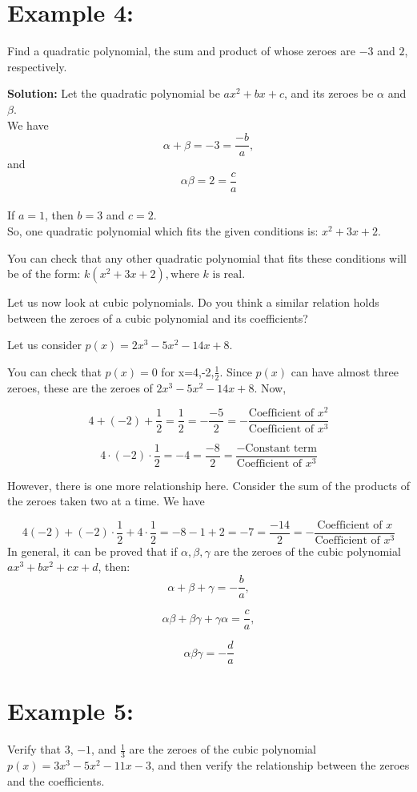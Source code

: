 \documentclass[12pt,twoside]{article}
\newcommand{\solution}{\noindent \textbf{\textcolor{customblue}{Solution:} }}
\begin{document}
\section*{\textcolor{customblue}{Example 4:}}

Find a quadratic polynomial, the sum and product of whose zeroes are $-3$ and $2$, respectively.

\solution Let the quadratic polynomial be $ax^2 + bx + c$, and its zeroes be $\alpha$ and $\beta$. \\
We have
\[\alpha + \beta = -3 = \frac{-b}{a},\]
and \[\alpha\beta=2=\frac{c}{a}\]
\\If $a = 1$, then $b=3$ and $c=2.$
\\So, one quadratic polynomial which fits the given conditions is:
$x^2 + 3x + 2.$

You can check that any other quadratic polynomial that fits these conditions will be of the form:
$k(x^2 + 3x + 2), \text {where \(k\) is real.}$

Let us now look at cubic polynomials. Do you think a similar relation holds
between the zeroes of a cubic polynomial and its coefficients?

Let us consider $p(x)=2x^3-5x^2-14x+8.$

You can check that $p(x)=0$ for x=4,-2,$\frac{1}{2}$. Since $p(x)$ can have almost three zeroes, these are the zeroes of $2x^3-5x^2-14x+8.$ Now,


\quad {}
\[4 + (-2) + \frac{1}{2} = \frac{1}{2} = -\frac{-5}{2} = -\frac{\text{Coefficient of } x^2}{\text{Coefficient of } x^3}\]

\quad {}
\[4 \cdot (-2) \cdot \frac{1}{2} = -4 = \frac{-8}{2} = \frac{-\text{Constant term}}{\text{Coefficient of } x^3}\]

However, there is one more relationship here. Consider the sum of the products
of the zeroes taken two at a time. We have


\[4 (-2) + (-2) \cdot \frac{1}{2} + 4 \cdot \frac{1}{2} = -8 -1 + 2 = -7 = \frac{-14}{2} = -\frac{\text{Coefficient of } x}{\text{Coefficient of } x^3}\]
In general, it can be proved that if $\alpha, \beta, \gamma$ are the zeroes of the cubic polynomial $ax^3 + bx^2 + cx + d$, then:
\[\alpha + \beta + \gamma = -\frac{b}{a},\]


\[\alpha\beta + \beta\gamma + \gamma\alpha = \frac{c}{a},\]


\[\alpha\beta\gamma = -\frac{d}{a}\]

\section*{\textcolor{customblue}{Example 5:}}
Verify that $3$, $-1$, and $\frac{1}{3}$ are the zeroes of the cubic polynomial $p(x) = 3x^3 - 5x^2 - 11x - 3$, and then verify the relationship between the zeroes and the coefficients.
\end{document}
